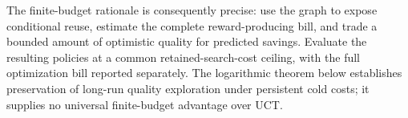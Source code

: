 The finite-budget rationale is consequently precise: use the graph to expose
conditional reuse, estimate the complete reward-producing bill, and trade a
bounded amount of optimistic quality for predicted savings. Evaluate the
resulting policies at a common retained-search-cost ceiling, with the full optimization bill reported separately. The logarithmic theorem below
establishes preservation of long-run quality exploration under persistent cold
costs; it supplies no universal finite-budget advantage over UCT.
